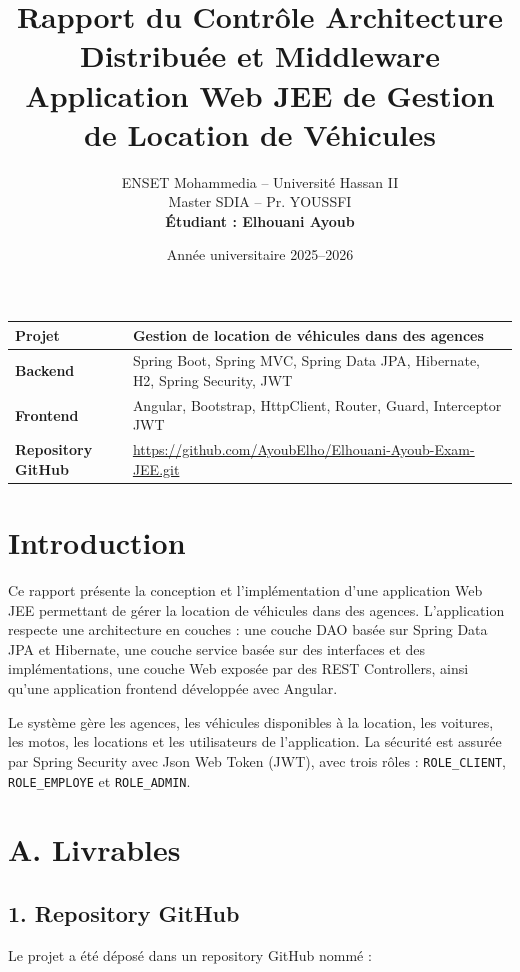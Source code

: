 \documentclass[12pt,a4paper]{article}
\title{
    \textbf{Rapport du Contrôle Architecture Distribuée et Middleware}\\
    \large Application Web JEE de Gestion de Location de Véhicules
}
\author{
    ENSET Mohammedia -- Université Hassan II\\
    Master SDIA -- Pr. YOUSSFI\\[0.3cm]
    \textbf{Étudiant : Elhouani Ayoub}
}
\date{Année universitaire 2025--2026}
\newcommand{\code}[1]{\texttt{#1}}
\newcommand{\question}[1]{\subsection*{#1}}
\begin{document}
\maketitle
\thispagestyle{empty}

\begin{center}
    \vspace{0.5cm}
    \begin{tabular}{|>{\bfseries}p{5cm}|p{9cm}|}
        \hline
        Projet & Gestion de location de véhicules dans des agences \\
        \hline
        Backend & Spring Boot, Spring MVC, Spring Data JPA, Hibernate, H2, Spring Security, JWT \\
        \hline
        Frontend & Angular, Bootstrap, HttpClient, Router, Guard, Interceptor JWT \\
        \hline
        Repository GitHub & \url{https://github.com/AyoubElho/Elhouani-Ayoub-Exam-JEE.git} \\
        \hline
    \end{tabular}
\end{center}

\newpage
\tableofcontents
\newpage

\section{Introduction}

Ce rapport présente la conception et l'implémentation d'une application Web JEE permettant de gérer la location de véhicules dans des agences.
L'application respecte une architecture en couches : une couche DAO basée sur Spring Data JPA et Hibernate, une couche service basée sur des interfaces et des implémentations, une couche Web exposée par des REST Controllers, ainsi qu'une application frontend développée avec Angular.

Le système gère les agences, les véhicules disponibles à la location, les voitures, les motos, les locations et les utilisateurs de l'application.
La sécurité est assurée par Spring Security avec Json Web Token (JWT), avec trois rôles : \code{ROLE\_CLIENT}, \code{ROLE\_EMPLOYE} et \code{ROLE\_ADMIN}.

\section{A. Livrables}

\question{1. Repository GitHub}

Le projet a été déposé dans un repository GitHub nommé :
\end{document}
